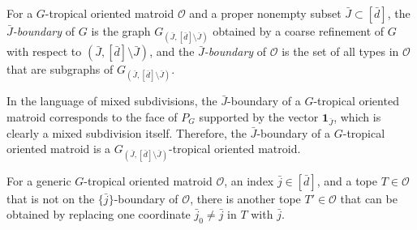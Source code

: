 \documentclass[letterpaper,reqno,11pt]{amsart}
\begin{document}
\begin{definition}
    For a $G$-tropical oriented matroid $\mathcal{O}$ and a proper nonempty subset $\bar{J}\subset [\bar{d}]$, the \emph{$\bar{J}$-boundary} of $G$ is the graph $G_{(\bar{J}, [\bar{d}]\setminus \bar{J})}$ obtained by a coarse refinement of $G$ with respect to $(\bar{J}, [\bar{d}]\setminus \bar{J})$, and the \emph{$\bar{J}$-boundary} of $\mathcal{O}$ is the set of all types in $\mathcal{O}$ that are subgraphs of $G_{(\bar{J}, [\bar{d}]\setminus \bar{J})}$.
\end{definition}

In the language of mixed subdivisions, the $\bar{J}$-boundary of a $G$-tropical oriented matroid corresponds to the face of $P_G$ supported by the vector $\mathbf{1}_{\bar{J}}$, which is clearly a mixed subdivision itself. Therefore, the $\bar{J}$-boundary of a $G$-tropical oriented matroid is a $G_{(\bar{J}, [\bar{d}]\setminus \bar{J})}$-tropical oriented matroid.

\begin{proposition}\label{prop:gen_link}
    For a generic $G$-tropical oriented matroid $\mathcal{O}$, an index $\bar{j}\in [\bar{d}]$, and a tope $T\in \mathcal{O}$ that is not on the $\{\bar{j}\}$-boundary of $\mathcal{O}$, there is another tope $T'\in \mathcal{O}$ that can be obtained by replacing one coordinate $\bar{j}_0\neq \bar{j}$ in $T$ with $\bar{j}$.
\end{proposition}
\end{document}
